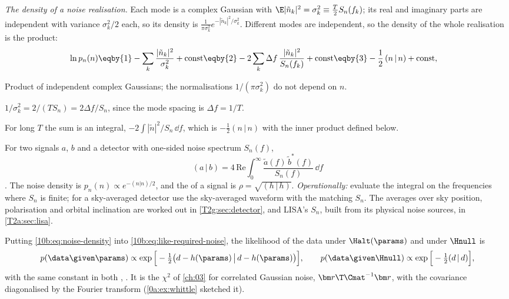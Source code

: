 \emph{The density of a noise realisation.} Each mode is a complex Gaussian with $\E|\tilde n_k|^2=\sigma_k^2\equiv
\tfrac T2S_n(f_k)$; its real and imaginary parts are independent with variance $\sigma_k^2/2$ each, so its density
is $\frac{1}{\pi\sigma_k^2}e^{-|\tilde n_k|^2/\sigma_k^2}$. Different modes are independent, so the density of the
whole realisation is the product:
\begin{align}
  \ln p_n(n)
  &\eqby{1}-\sum_k\frac{|\tilde n_k|^2}{\sigma_k^2}+\text{const}
   \eqby{2}-2\sum_k\Delta f\,\frac{|\tilde n_k|^2}{S_n(f_k)}+\text{const}
   \eqby{3}-\frac12\,(n\,|\,n)+\text{const},
  \label{10b:eq:noise-density}
\end{align}
\begin{explain}
  \item Product of independent complex Gaussians; the normalisations $1/(\pi\sigma_k^2)$ do not depend on $n$.
  \item $1/\sigma_k^2=2/(TS_n)=2\Delta f/S_n$, since the mode spacing is $\Delta f=1/T$.
  \item For long $T$ the sum is an integral, $-2\int|\tilde n|^2/S_n\,\dd f$, which is $-\frac12(n\,|\,n)$ with the
        inner product defined below.
\end{explain}

\begin{workdef}
For two signals $a$, $b$ and a detector with one-sided noise spectrum $S_n(f)$,
\[
  (a\,|\,b)=4\,\mathrm{Re}\int_0^\infty\frac{\tilde a(f)\,\tilde b^*(f)}{S_n(f)}\,\dd f
\]
.
The noise density is $p_n(n)\propto e^{-(n|n)/2}$, and the  of a signal is
$\rho=\sqrt{(h\,|\,h)}$. \emph{Operationally:} evaluate the integral on the frequencies where $S_n$ is finite;
for a sky-averaged detector use the sky-averaged waveform with the matching $S_n$. The averages over sky
position, polarisation and orbital inclination are worked out in \cref{T2g:sec:detector}, and LISA's $S_n$, built from
its physical noise sources, in \cref{T2a:sec:lisa}.
\end{workdef}

Putting \eqref{10b:eq:noise-density} into \eqref{10b:eq:like-required-noise}, the likelihood of the data under
$\Halt(\params)$ and under $\Hnull$ is
\begin{equation}
  p(\data\given\params)\propto\exp\Big[-\tfrac12\big(d-h(\params)\,\big|\,d-h(\params)\big)\Big],
  \qquad
  p(\data\given\Hnull)\propto\exp\Big[-\tfrac12(d\,|\,d)\Big],
  \label{10b:eq:gw-like}
\end{equation}
with the same constant in both \cite[eq.~(7)]{CutlerFlanagan1994}, \cite{Finn1992}. It is the $\chi^2$ of
\cref{ch:03} for correlated Gaussian noise, $\bm r\T\Cmat^{-1}\bm r$, with the covariance diagonalised by the
Fourier transform (\cref{0a:ex:whittle} sketched it).

